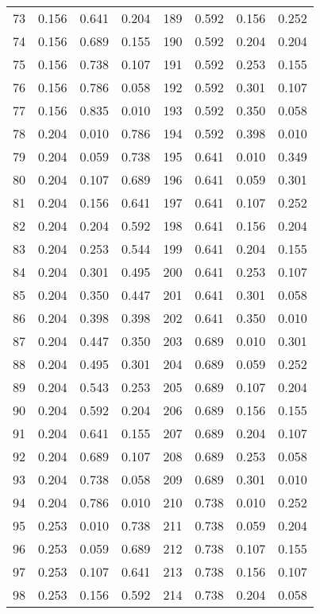 \documentclass[journal=mamobx,manuscript=suppinfo]{achemso}
\begin{document}
\begin{longtable}{cccc|cccc}
73 & 0.156 & 0.641 & 0.204  & 189 & 0.592 & 0.156 & 0.252 \\
74 & 0.156 & 0.689 & 0.155  & 190 & 0.592 & 0.204 & 0.204 \\
75 & 0.156 & 0.738 & 0.107  & 191 & 0.592 & 0.253 & 0.155 \\
76 & 0.156 & 0.786 & 0.058  & 192 & 0.592 & 0.301 & 0.107 \\
77 & 0.156 & 0.835 & 0.010  & 193 & 0.592 & 0.350 & 0.058 \\
78 & 0.204 & 0.010 & 0.786  & 194 & 0.592 & 0.398 & 0.010 \\
79 & 0.204 & 0.059 & 0.738  & 195 & 0.641 & 0.010 & 0.349 \\
80 & 0.204 & 0.107 & 0.689  & 196 & 0.641 & 0.059 & 0.301 \\
81 & 0.204 & 0.156 & 0.641  & 197 & 0.641 & 0.107 & 0.252 \\
82 & 0.204 & 0.204 & 0.592  & 198 & 0.641 & 0.156 & 0.204 \\
83 & 0.204 & 0.253 & 0.544  & 199 & 0.641 & 0.204 & 0.155 \\
84 & 0.204 & 0.301 & 0.495  & 200 & 0.641 & 0.253 & 0.107 \\
85 & 0.204 & 0.350 & 0.447  & 201 & 0.641 & 0.301 & 0.058 \\
86 & 0.204 & 0.398 & 0.398  & 202 & 0.641 & 0.350 & 0.010 \\
87 & 0.204 & 0.447 & 0.350  & 203 & 0.689 & 0.010 & 0.301 \\
88 & 0.204 & 0.495 & 0.301  & 204 & 0.689 & 0.059 & 0.252 \\
89 & 0.204 & 0.543 & 0.253  & 205 & 0.689 & 0.107 & 0.204 \\
90 & 0.204 & 0.592 & 0.204  & 206 & 0.689 & 0.156 & 0.155 \\
91 & 0.204 & 0.641 & 0.155  & 207 & 0.689 & 0.204 & 0.107 \\
92 & 0.204 & 0.689 & 0.107  & 208 & 0.689 & 0.253 & 0.058 \\
93 & 0.204 & 0.738 & 0.058  & 209 & 0.689 & 0.301 & 0.010 \\
94 & 0.204 & 0.786 & 0.010  & 210 & 0.738 & 0.010 & 0.252 \\
95 & 0.253 & 0.010 & 0.738  & 211 & 0.738 & 0.059 & 0.204 \\
96 & 0.253 & 0.059 & 0.689  & 212 & 0.738 & 0.107 & 0.155 \\
97 & 0.253 & 0.107 & 0.641  & 213 & 0.738 & 0.156 & 0.107 \\
98 & 0.253 & 0.156 & 0.592  & 214 & 0.738 & 0.204 & 0.058 \\

\end{longtable}
\end{document}
